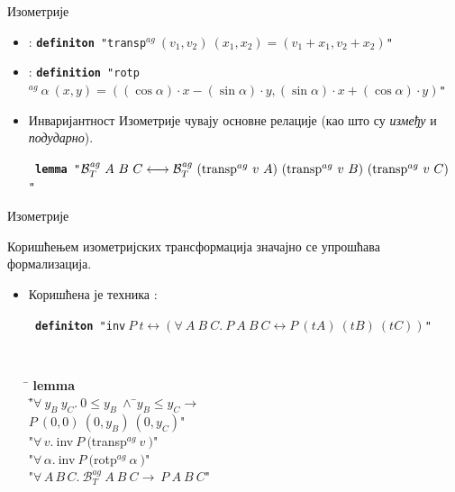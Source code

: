 \documentclass[slidestop, compress, mathserif, containsverbatim, xcolor=dvipsnames]{beamer}
\newcommand{\agbett}[3]{\ensuremath{\mathcal{B}_T^{\mathit{ag}}\ #1\ #2\ #3}}
\newcommand{\ag}[2]{\ensuremath{^{ag}\ #1\ #2}}
\begin{document}
\begin{frame}{Изометрије}
  \begin{itemize}
    \item {}: {\tt {\bf definiton} "transp$\ag{(v_1, v_2)}{(x_1, x_2)} = (v_1 + x_1, v_2 + x_2)$"\ }
    \item {}: {\tt {\bf definition} "rotp$\ag{\alpha}{(x, y)} = ((\cos \alpha)\cdot x - (\sin
\alpha)\cdot y , (\sin \alpha)\cdot x + (\cos \alpha)\cdot y)$"\ }
    \item \begin{block}{Инваријантност} 
      Изометрије чувају основне релације (као што су \emph{између} и \emph{подударно}).
      \end{block}
      {\tt
        {\bf lemma} "$\agbett{A}{B}{C} \longleftrightarrow \agbett{($transp$\ag{v}{A})}{($transp$\ag{v}{B})}{($transp$\ag{v}{C})}$"\
      }
  \end{itemize}
\end{frame}

\begin{frame}{Изометрије}
  \begin{block}{}
    Коришћењем изометријских трансформација значајно се упрошћава
    формализација.
  \end{block}
  \begin{itemize}
  \item Коришћена је техника :
    
    {\tt
      {\bf definiton} "inv$\ P\ t \longleftrightarrow (\forall\ A\ B\ C.\ P\ A\ B\ C
      \longleftrightarrow P\ (t A)\ (t B)\ (t C))$"\ 
    }


    {\tt
      \begin{tabbing}
        \hspace{5mm}\=\kill
               {\bf lemma}\\
                \="$\forall\ y_B\ y_C.\ 0 \le y_B \ \wedge\ $\=$y_B \le y_C \longrightarrow$ \\
               \>\>                                                        \>$P\ (0, 0)\ (0, y_B)\ (0, y_C)$"\\
               \>\>       "$\forall\,v.\ $inv$\ P\ ($transp$\ag{v}{})$" \\
               \>\>       "$\forall\,\alpha.\ $inv$\ P\ ($rotp$\ag{\alpha}{})$"\\
               \>{\bf shows}\>"$\forall\,A\,B\,C.\ \agbett{A}{B}{C} \longrightarrow\ P\ A\ B\ C$"
      \end{tabbing}
    } 
  \end{itemize}
\end{frame}
\end{document}
